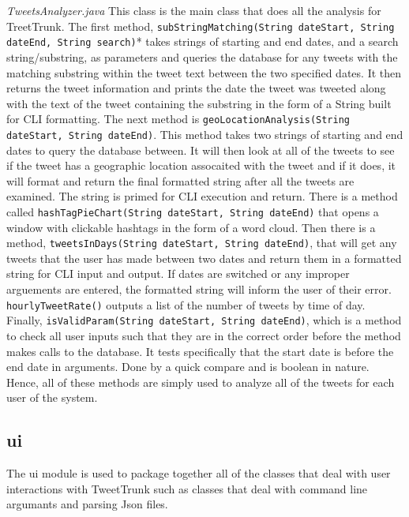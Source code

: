 \documentclass[a4paper, 12pt]{article}
\begin{document}
\begin{adjustwidth}{2em}{0pt}
\begin{adjustwidth}{2em}{0pt}
\noindent \textit{TweetsAnalyzer.java} \newline
This class is the main class that does all the analysis for TreetTrunk. The first method, \texttt{subStringMatching(String dateStart, String dateEnd, String search)}* takes strings of starting and end dates, and a search string/substring, as parameters and queries the database for any tweets with the matching substring within the tweet text between the two specified dates.  It then returns the tweet information and prints the date the tweet was tweeted along with the text of the tweet containing the substring in the form of a String built for CLI formatting. The next method is \texttt{geoLocationAnalysis(String dateStart, String dateEnd)}. This method takes two strings of starting and end dates to query the database between.  It will then look at all of the tweets to see if the tweet has a geographic location assocaited with the tweet and if it does, it will format and return the final formatted string after all the tweets are examined.  The string is primed for CLI execution and return. There is a method called  \texttt{hashTagPieChart(String dateStart, String dateEnd)} that opens a window with clickable hashtags in the form of a word cloud. Then there is a method, \texttt{tweetsInDays(String dateStart, String dateEnd)}, that will get any tweets that the user has made between two dates and return them in a formatted string for CLI input and output.  If dates are switched or any improper  arguements are entered, the formatted string will inform the user of their error. \texttt{hourlyTweetRate()} outputs a list of the number of tweets by time of day. Finally,  \texttt{isValidParam(String dateStart, String dateEnd)}, which is a  method to check all user inputs such that they are in the correct order before the method makes calls to the database.  It tests specifically that the start date is before the end date in arguments. Done by a quick compare and is boolean in nature. Hence, all of these methods are simply used to analyze all of the tweets for each user of the system. \newline\newline


\end{adjustwidth}

\subsection{ui} \label{sec:archb}
\begin{adjustwidth}{2em}{0pt}
The ui module is used to package together all of the classes that deal with user interactions with TweetTrunk such as classes that deal with command line argumants and parsing Json files. \newline


\end{adjustwidth}
\end{adjustwidth}
\end{document}
